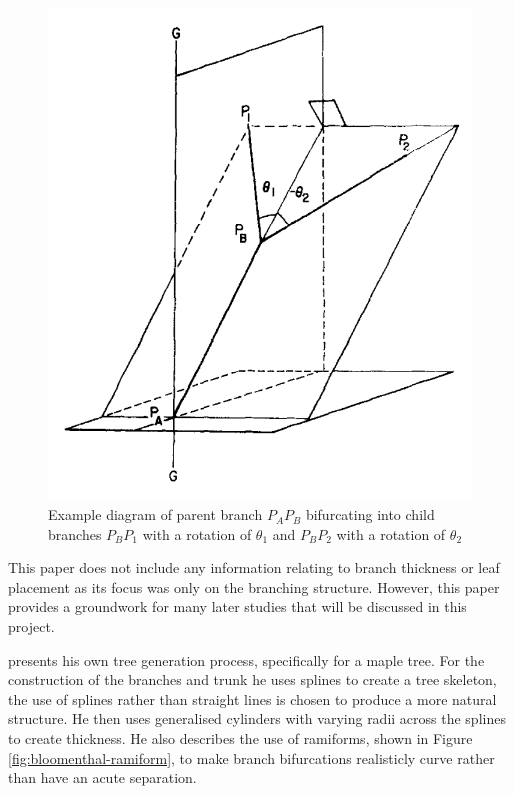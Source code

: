 \documentclass[final]{cmpreport}
\begin{document}
\begin{figure}[ht]
    \includegraphics[scale=0.5]{honda-bifurcation.PNG}
    \centering
    \captionsetup{justification=centering}
    \caption{Example diagram of parent branch $P_AP_B$ bifurcating into child branches
    $P_BP_1$ with a rotation of $\theta_1$ and $P_BP_2$ with a rotation of \textminus$\theta_2$}
    \label{fig:honda-bifurcation}
\end{figure}

This paper does not include any information relating to branch thickness or leaf 
placement as its focus was only on the branching structure. However, this paper 
provides a groundwork for many later studies that will be discussed in this project.

\cite{bloomenthal1985modeling} presents his own tree generation process, specifically 
for a maple tree. For the construction of the branches and 
trunk he uses splines to create a tree skeleton, the use of splines rather than 
straight lines is chosen to produce a more natural structure. He then uses generalised 
cylinders with varying radii across the splines to create thickness. He also describes 
the use of ramiforms, shown in Figure \ref{fig:bloomenthal-ramiform}, to make branch 
bifurcations realisticly curve rather than have an acute separation.
\end{document}
